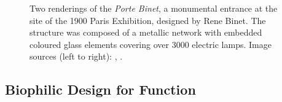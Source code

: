 \documentclass{article}
\begin{document}
\begin{figure}[ht!]
    \centering
    \caption{Two renderings of the \textit{Porte Binet}, a monumental entrance at the site of the 1900 Paris Exhibition, designed by Rene Binet. The structure was composed of a metallic network with embedded coloured glass elements covering over 3000 electric lamps. \newline Image sources (left to right): \cite{louis_porte_1900}, \cite{binet_projet_1898}.}
    \label{fig:porte_binet}
\end{figure}

\clearpage
\subsection{Biophilic Design for Function}
\end{document}
